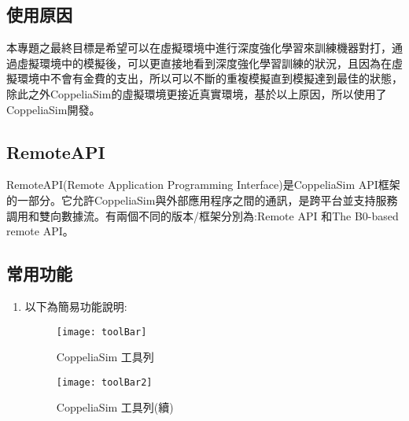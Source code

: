 \subsection{使用原因}
 本專題之最終目標是希望可以在虛擬環境中進行深度強化學習來訓練機器對打，通過虛擬環境中的模擬後，可以更直接地看到深度強化學習訓練的狀況，且因為在虛擬環境中不會有金費的支出，所以可以不斷的重複模擬直到模擬達到最佳的狀態，除此之外CoppeliaSim的虛擬環境更接近真實環境，基於以上原因，所以使用了CoppeliaSim開發。\\
\subsection{RemoteAPI}
 RemoteAPI(Remote Application Programming Interface)是CoppeliaSim API框架的一部分。它允許CoppeliaSim與外部應用程序之間的通訊，是跨平台並支持服務調用和雙向數據流。有兩個不同的版本/框架分別為:Remote API 和The B0-based remote API。\\
\subsection{常用功能}
\begin{enumerate}
\item 以下為簡易功能說明:
\begin{figure}[hbt!]
\center
\texttt{[image: toolBar]}
\caption{\Large CoppeliaSim 工具列}
\texttt{[image: toolBar2]}
\caption{\Large CoppeliaSim 工具列(續)}
\end{figure}
\begin{table}[hbt!]
\center
\large
{}
\caption{\Large 功能說明}
\end{table}
\newpage
\end{enumerate}
